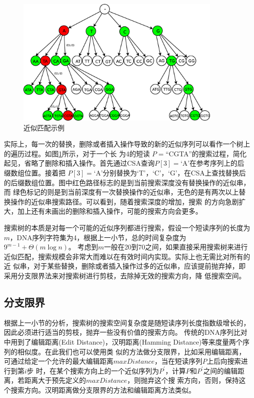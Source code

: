 \documentclass[UTF8,adobefonts]{ctexart}
\begin{document}
\begin{figure}[htbp]
    \centering
    \includegraphics[width=0.9\textwidth]{searchtree.eps}
    \caption{近似匹配示例} \label{fig:searchtree}
\end{figure}

实际上，每一次的替换，删除或者插入操作导致的新的近似序列可以看作一个树上的遍历过程。如图\ref{fig:searchtree}所示，对于一个长
为4的短读 $P=$``CGTA''的搜索过程，简化起见，省略了删除和插入操作。首先通过CSA查询$P[3]=$`A'在参考序列上的后缀数组位置。接着把
$P[3]=$`A'分别替换为`T'，`C'，`G'，在CSA上查找替换后的后缀数组位置。图中红色路径标志的是到当前搜索深度没有替换操作的近似串，而
绿色标记的则是到当前深度有一次替换操作的近似串，无色的是有两次以上替换操作的近似串搜索路径。可以看到，随着搜索深度的增加，搜索
的方向急剧扩大，加上还有未画出的删除和插入操作，可能的搜索方向会更多。

搜索树的本质是对每一个可能的近似序列都进行搜索，假设一个短读序列的长度为$m$，DNA序列字符集为4，根据上一小节，总的时间复杂度为$9^{m-1}+\Theta(m\log n)$。
考虑到$m$一般在20到70之间，如果直接采用搜索树来进行近似匹配，搜索规模会非常大而难以在有效时间内实现。实际上也无需比对所有的近
似串，对于某些替换，删除或者插入操作过多的近似串，应该提前抛弃掉，即采用分支限界法来对搜索树进行剪枝，去除掉无效的搜索方向，降
低搜索空间。

\subsection{分支限界}

根据上一小节的分析，搜索树的搜索空间复杂度是随短读序列长度指数级增长的，因此必须进行适当的剪枝，抛弃一些没有价值的搜索方向。
传统的DNA序列比对中用到了编辑距离(Edit Distance)，汉明距离(Hamming Distance)等来度量两个序列的相似度。在此我们也可以使用类
似的方法做分支限界，比如采用编辑距离，可通过给定一个允许的最大编辑距离$maxDistance$，当在短读序列$P$上后向搜索进行到第$i$步
时，在某个搜索方向上的一个近似序列为$P^{'}$，计算$P$和$P^{'}$之间的编辑距离，若距离大于预先定义的$maxDistance$，则抛弃这个搜
索方向，否则，保持这个搜索方向。汉明距离做分支限界的方法和编辑距离方法类似。
\end{document}
